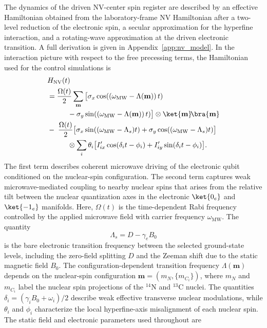 \documentclass[
  aps,
  pra,
  reprint,            %
  superscriptaddress, %
  amsmath,amssymb,
  notitlepage
]{revtex4-2}
\begin{document}
The dynamics of the driven NV-center spin register are described by an effective Hamiltonian obtained from the laboratory-frame NV Hamiltonian after a two-level reduction of the electronic spin, a secular approximation for the hyperfine interaction, and a rotating-wave approximation at the driven electronic transition. A full derivation is given in Appendix~\ref{app:nv_model}. In the interaction picture with respect to the free precessing terms, the Hamiltonian used for the control simulations is
\begin{equation}
\begin{aligned}
&\notag H_{\mathrm{NV}}(t)\\
&=\frac{\Omega(t)}{2}\sum_{\mathbf m}
\big[\sigma_x\cos((\omega_{\mathrm{MW}}-\Lambda(\mathbf m))\,t)\\
&\hspace{1.0cm}-\sigma_y\sin((\omega_{\mathrm{MW}}-\Lambda(\mathbf m))\,t)\big] \otimes \ket{\mathbf m}\!\bra{\mathbf m} \\
&-\;\frac{\Omega(t)}{2}\big[\sigma_x\sin((\omega_{\mathrm{MW}}-\Lambda_s) t)+\sigma_y\cos((\omega_{\mathrm{MW}}-\Lambda_s) t)\big] \\
&\hspace{1.0cm}\otimes\sum_i \theta_i \big[I'_{ix}\cos(\delta_i t-\phi_i)+I'_{iy}\sin(\delta_i t-\phi_i)\big].
\end{aligned}
\label{eq:H_NV_RWA_main}
\end{equation}
The first term describes coherent microwave driving of the electronic qubit conditioned on the nuclear-spin configuration. The second term captures weak microwave-mediated coupling to nearby nuclear spins that arises from the relative tilt between the nuclear quantization axes in the electronic $\ket{0_e}$ and $\ket{-1_e}$ manifolds. Here, $\Omega(t)$ is the time-dependent Rabi frequency controlled by the applied microwave field with carrier frequency $\omega_{\mathrm{MW}}$. The quantity
\begin{equation}
\Lambda_s = D - \gamma_e B_0
\end{equation}
is the bare electronic transition frequency between the selected ground-state levels, including the zero-field splitting $D$ and the Zeeman shift due to the static magnetic field $B_0$. The configuration-dependent transition frequency $\Lambda(\mathbf m)$ depends on the nuclear-spin configuration $\mathbf m=(m_N,\{m_{C_i}\})$, where $m_N$ and $m_{C_i}$ label the nuclear spin projections of the $^{14}\mathrm{N}$ and $^{13}\mathrm{C}$ nuclei. The quantities $\delta_i=(\gamma_i B_0+\omega_i)/2$ describe weak effective transverse nuclear modulations, while $\theta_i$ and $\phi_i$ characterize the local hyperfine-axis misalignment of each nuclear spin. The static field and electronic parameters used throughout are
\end{document}
